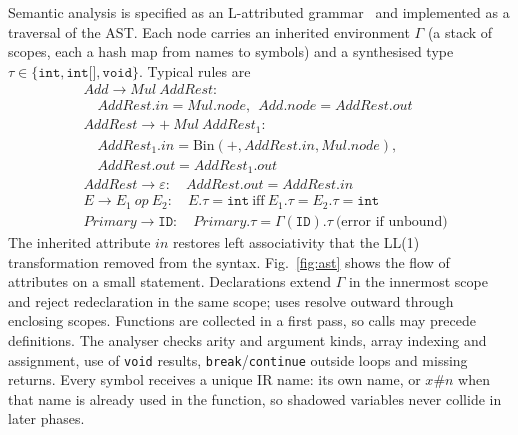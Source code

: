\documentclass{ieeeaccess}
\newcommand{\nt}[1]{\textit{#1}}
\newcommand{\tm}[1]{\texttt{#1}}
\begin{document}
Semantic analysis is specified as an L-attributed grammar~\cite{knuth1968attr}
and implemented as a traversal of the AST. Each node carries an
inherited environment $\Gamma$ (a stack of scopes, each a hash map from
names to symbols) and a synthesised type
$\tau\in\{\tm{int},\tm{int[]},\tm{void}\}$. Typical rules are
\begin{equation}
\begin{aligned}
&\nt{Add}\to\nt{Mul}\ \nt{AddRest}:\\
&\quad \nt{AddRest}.\mathit{in}=\nt{Mul}.\mathit{node},\ \
       \nt{Add}.\mathit{node}=\nt{AddRest}.\mathit{out}\\
&\nt{AddRest}\to\tm{+}\ \nt{Mul}\ \nt{AddRest}_1:\\
&\quad \nt{AddRest}_1.\mathit{in}=\mathrm{Bin}(\tm{+},\nt{AddRest}.\mathit{in},\nt{Mul}.\mathit{node}),\\
&\quad \nt{AddRest}.\mathit{out}=\nt{AddRest}_1.\mathit{out}\\
&\nt{AddRest}\to\varepsilon:\quad \nt{AddRest}.\mathit{out}=\nt{AddRest}.\mathit{in}\\
&E\to E_1\ \mathit{op}\ E_2:\quad E.\tau=\tm{int}\ \text{iff}\ E_1.\tau=E_2.\tau=\tm{int}\\
&\nt{Primary}\to\tm{ID}:\quad \nt{Primary}.\tau=\Gamma(\tm{ID}).\tau\ \text{(error if unbound)}
\end{aligned}
\label{eq:attr}
\end{equation}
The inherited attribute $\mathit{in}$ restores left associativity that
the LL(1) transformation removed from the syntax. Fig.~\ref{fig:ast}
shows the flow of attributes on a small statement. Declarations
extend $\Gamma$ in the innermost scope and reject redeclaration in the
same scope; uses resolve outward through enclosing scopes. Functions
are collected in a first pass, so calls may precede definitions. The
analyser checks arity and argument kinds, array indexing and
assignment, use of \tm{void} results, \tm{break}/\tm{continue} outside
loops and missing returns. Every symbol receives a unique IR name: its
own name, or $x\#n$ when that name is already used in the function, so
shadowed variables never collide in later phases.
\end{document}
